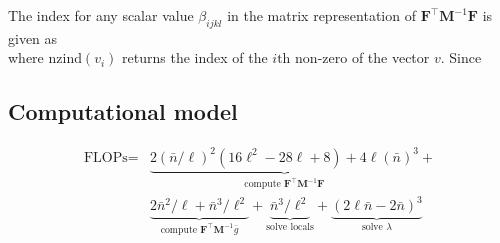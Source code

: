 The index for any scalar value $\beta_{i j k l}$ in the matrix representation of $\textbf{F}^{\intercal}\textbf{M}^{-1}\textbf{F}$ is given as 
\begin{equation}
[(N - 1) i + \text{nzind}(\textbf{f}^{\text{ind}}_{ij}) + l, (N - 1) i + \text{nzind}(\textbf{f}^{\text{ind}}_{ik}) + l]
\end{equation}
\noindent
where $\text{nzind}(v_i)$ returns the index of the $i\text{th}$ non-zero of the vector $v$. Since 

\subsection{Computational model}
\begin{equation}
\begin{split}
	\text{FLOPs} = & \underbrace{2(\bar{n}/\ell)^2 (16\ell^2 - 28\ell + 8) + 4\ell(
	\bar{n})^3}_{\text{compute }\textbf{F}^{\intercal} \textbf{M}^{-1} \textbf{F}} + \\
	& \underbrace{2 \bar{n}^2 / \ell + \bar{n}^3 / \ell^2}_{\text{compute }\textbf{F}^{\intercal} \textbf{M}^{-1} \bar{g}} 
	+ \underbrace{\bar{n}^3 / \ell^2 }_{\text{solve locals}} 
	+ \underbrace{(2\ell \bar{n} - 2\bar{n})^3}_{\text{solve } \lambda} 
\end{split}
\end{equation}



